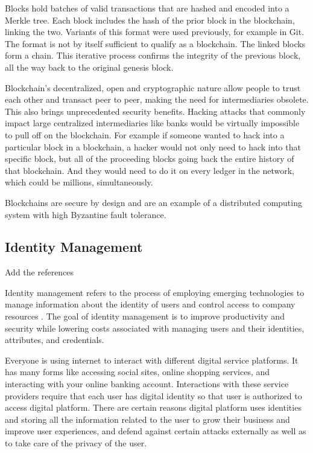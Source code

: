 Blocks hold batches of valid transactions that are hashed and encoded into a Merkle tree. Each block includes the hash of the prior block in the blockchain, linking the two. Variants of this format were used previously, for example in Git. The format is not by itself sufficient to qualify as a blockchain. The linked blocks form a chain. This iterative process confirms the integrity of the previous block, all the way back to the original genesis block.


Blockchain’s decentralized, open and cryptographic nature allow people to trust each other and transact peer to peer, making the need for intermediaries obsolete. This also brings unprecedented security benefits. Hacking attacks that commonly impact large centralized intermediaries like banks would be virtually impossible to pull off on the blockchain. For example if someone wanted to hack into a particular block in a blockchain, a hacker would not only need to hack into that specific block, but all of the proceeding blocks going back the entire history of that blockchain. And they would need to do it on every ledger in the network, which could be millions, simultaneously.


Blockchains are secure by design and are an example of a distributed computing system with high Byzantine fault tolerance.

\subsection{Identity Management}
\begin{notation}
  Add the references
\end{notation}

Identity management refers to the process of employing emerging technologies to manage information about the identity of users and control access to company resources \cite{IdentityManagement}. The goal of identity management is to improve productivity and security while lowering costs associated with managing users and their identities, attributes, and credentials.

Everyone is using internet to interact with different digital service platforms.
It has many forms like accessing social sites, online shopping services, and interacting with your online banking account. Interactions with these service providers require that each user has digital identity so that user is authorized to access digital platform. There are certain reasons digital platform uses identities and storing all the information related to the user to grow their business and improve user experiences, and defend against certain attacks externally as well as to take care of the privacy of the user.

